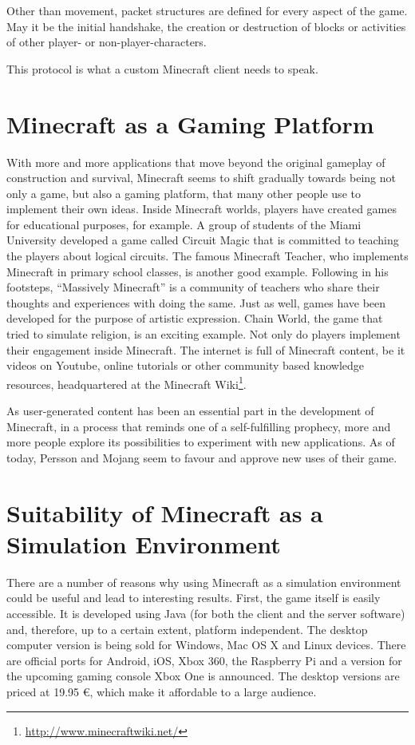 Other than movement, packet structures are defined for every aspect of the game. May it be the initial handshake, the creation or destruction of blocks or activities of other player- or non-player-characters.

This protocol is what a custom Minecraft client needs to speak.

    \section{Minecraft as a Gaming Platform}
With more and more applications that move beyond the original gameplay of construction and survival, Minecraft seems to shift gradually towards being not only a game, but also a gaming platform, that many other people use to implement their own ideas. Inside Minecraft worlds, players have created games for educational purposes, for example. A group of students of the Miami University developed a game called Circuit Magic that is committed to teaching the players about logical circuits. The famous Minecraft Teacher, who implements Minecraft in primary school classes, is another good example. Following in his footsteps, ``Massively Minecraft'' is a community of teachers who share their thoughts and experiences with doing the same. Just as well, games have been developed for the purpose of artistic expression. Chain World, the game that tried to simulate religion, is an exciting example. Not only do players implement their engagement inside Minecraft. The internet is full of Minecraft content, be it videos on Youtube, online tutorials or other community based knowledge resources, headquartered at the Minecraft Wiki\footnote{\url{http://www.minecraftwiki.net/}}.~\cite{Duncan:2011:MBC:2207096.2207097}

As user-generated content has been an essential part in the development of Minecraft, in a process that reminds one of a self-fulfilling prophecy, more and more people explore its possibilities to experiment with new applications. As of today, Persson and Mojang seem to favour and approve new uses of their game.~\cite{Duncan:2011:MBC:2207096.2207097}

    \section{Suitability of Minecraft as a Simulation Environment}
There are a number of reasons why using Minecraft as a simulation environment could be useful and lead to interesting results. First, the game itself is easily accessible. It is developed using Java (for both the client and the server software) and, therefore, up to a certain extent, platform independent. The desktop computer version is being sold for Windows, Mac OS X and Linux devices. There are official ports for Android, iOS, Xbox 360, the Raspberry Pi and a version for the upcoming gaming console Xbox One is announced. The desktop versions are priced at 19.95 \euro, which make it affordable to a large audience.

